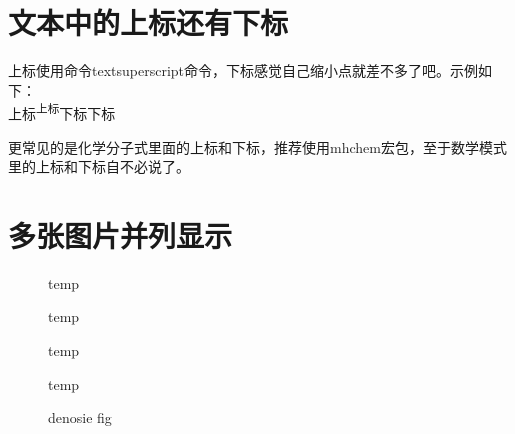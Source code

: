 \documentclass[11pt,oneside]{book}
\begin{document}
\section{文本中的上标还有下标}
上标使用命令textsuperscript命令，下标感觉自己缩小点就差不多了吧。示例如下：\\
上标\textsuperscript{上标}下标{\scriptsize 下标}

更常见的是化学分子式里面的上标和下标，推荐使用mhchem宏包，至于数学模式里的上标和下标自不必说了。


\section{多张图片并列显示}
\label{sec:多张图片并列显示}

\begin{figure}[H]
\label{fig:四栏图片}
\begin{multicols}{4}
\begin{linefig}{temp}
\end{linefig}
\begin{linefig}{temp}
\end{linefig}
\begin{linefig}{temp}
\end{linefig}
\begin{linefig}{temp}
\end{linefig}
\end{multicols}
\caption{denosie fig}
\label{fig:denosie fig}
\end{figure}
\end{document}
